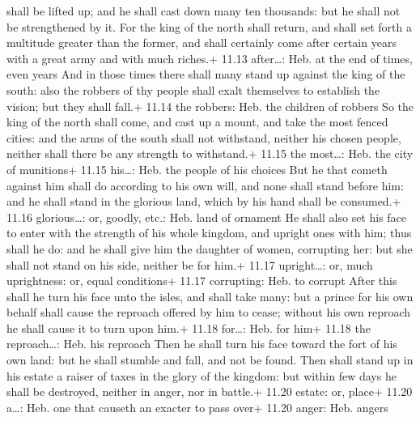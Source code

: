shall be lifted up; and he shall cast down many ten thousands: but he
shall not be strengthened by it.  For the king of the north
shall return, and shall set forth a multitude greater than the former,
and shall certainly come after certain years with a great army and with
much riches.+ 11.13 after\ldots: Heb. at the end of times, even years
 And in those times there shall many stand up against the
king of the south: also the robbers of thy people shall exalt themselves
to establish the vision; but they shall fall.+ 11.14 the robbers: Heb.
the children of robbers  So the king of the north shall
come, and cast up a mount, and take the most fenced cities: and the arms
of the south shall not withstand, neither his chosen people, neither
shall there be any strength to withstand.+ 11.15 the most\ldots: Heb.
the city of munitions+ 11.15 his\ldots: Heb. the people of his choices
 But he that cometh against him shall do according to his
own will, and none shall stand before him: and he shall stand in the
glorious land, which by his hand shall be consumed.+ 11.16
glorious\ldots: or, goodly, etc.: Heb. land of ornament  He
shall also set his face to enter with the strength of his whole kingdom,
and upright ones with him; thus shall he do: and he shall give him the
daughter of women, corrupting her: but she shall not stand on his side,
neither be for him.+ 11.17 upright\ldots: or, much uprightness: or,
equal conditions+ 11.17 corrupting: Heb. to corrupt  After
this shall he turn his face unto the isles, and shall take many: but a
prince for his own behalf shall cause the reproach offered by him to
cease; without his own reproach he shall cause it to turn upon him.+
11.18 for\ldots: Heb. for him+ 11.18 the reproach\ldots: Heb. his
reproach  Then he shall turn his face toward the fort of
his own land: but he shall stumble and fall, and not be found.
 Then shall stand up in his estate a raiser of taxes in the
glory of the kingdom: but within few days he shall be destroyed, neither
in anger, nor in battle.+ 11.20 estate: or, place+ 11.20 a\ldots: Heb.
one that causeth an exacter to pass over+ 11.20 anger: Heb. angers

